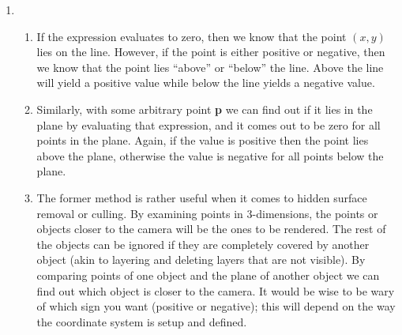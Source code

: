 \documentclass[11pt]{article}
\begin{document}
\begin{enumerate}
  \item
    \begin{enumerate}
      \item If the expression evaluates to zero, then we know that the point $(x,y)$ lies on the line. However, if the point is either positive or negative, then we know that the point lies ``above'' or ``below'' the line. Above the line will yield a positive value while below the line yields a negative value.
      \item Similarly, with some arbitrary point \textbf{p} we can find out if it lies in the plane by evaluating that expression, and it comes out to be zero for all points in the plane. Again, if the value is positive then the point lies above the plane, otherwise the value is negative for all points below the plane.
      \item The former method is rather useful when it comes to hidden surface removal or culling. By examining points in 3-dimensions, the points or objects closer to the camera will be the ones to be rendered. The rest of the objects can be ignored if they are completely covered by another object (akin to layering and deleting layers that are not visible). By comparing points of one object and the plane of another object we can find out which object is closer to the camera. It would be wise to be wary of which sign you want (positive or negative); this will depend on the way the coordinate system is setup and defined.
    \end{enumerate}


\end{enumerate}
\end{document}
